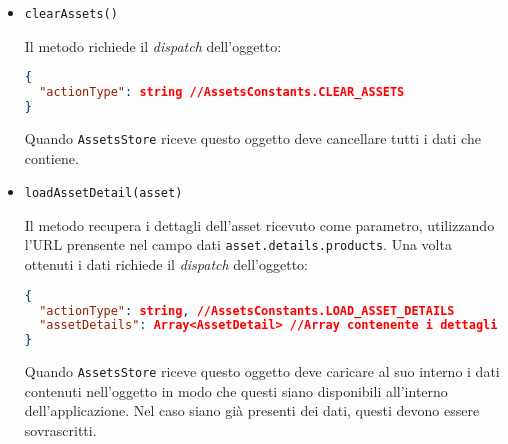 \begin{itemize}
\item \texttt{clearAssets()}

Il metodo richiede il \textit{dispatch} dell'oggetto:
\begin{lstlisting}[language=JSON, caption=Action - clear assets]
{
  "actionType": string //AssetsConstants.CLEAR_ASSETS
}
\end{lstlisting}

Quando \texttt{AssetsStore} riceve questo oggetto deve cancellare tutti i dati che contiene.

\item \texttt{loadAssetDetail(asset)}

Il metodo recupera i dettagli dell'asset ricevuto come parametro, utilizzando l'URL prensente nel campo dati \texttt{asset.details.products}.
Una volta ottenuti i dati richiede il \textit{dispatch} dell'oggetto:

\begin{lstlisting}[language=JSON, caption=Action - load asset details]
{
  "actionType": string, //AssetsConstants.LOAD_ASSET_DETAILS
  "assetDetails": Array<AssetDetail> //Array contenente i dettagli dell'asset
}
\end{lstlisting}

Quando \texttt{AssetsStore} riceve questo oggetto deve caricare al suo interno i dati contenuti nell'oggetto in modo che questi siano disponibili all'interno dell'applicazione. Nel caso siano già presenti dei dati, questi devono essere sovrascritti.

\end{itemize}